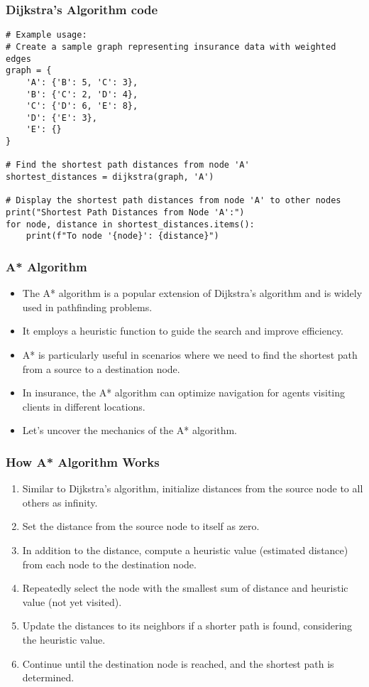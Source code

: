\begin{frame}[fragile]\frametitle{Dijkstra's Algorithm code}
{\tiny
\begin{lstlisting}
# Example usage:
# Create a sample graph representing insurance data with weighted edges
graph = {
    'A': {'B': 5, 'C': 3},
    'B': {'C': 2, 'D': 4},
    'C': {'D': 6, 'E': 8},
    'D': {'E': 3},
    'E': {}
}

# Find the shortest path distances from node 'A'
shortest_distances = dijkstra(graph, 'A')

# Display the shortest path distances from node 'A' to other nodes
print("Shortest Path Distances from Node 'A':")
for node, distance in shortest_distances.items():
    print(f"To node '{node}': {distance}")

\end{lstlisting}
}
\end{frame}


\begin{frame}[fragile]\frametitle{A* Algorithm}
\begin{itemize}
\item The A* algorithm is a popular extension of Dijkstra's algorithm and is widely used in pathfinding problems.
\item It employs a heuristic function to guide the search and improve efficiency.
\item A* is particularly useful in scenarios where we need to find the shortest path from a source to a destination node.
\item In insurance, the A* algorithm can optimize navigation for agents visiting clients in different locations.
\item Let's uncover the mechanics of the A* algorithm.
\end{itemize}
\end{frame}

\begin{frame}[fragile]\frametitle{How A* Algorithm Works}
\begin{enumerate}
\item Similar to Dijkstra's algorithm, initialize distances from the source node to all others as infinity.
\item Set the distance from the source node to itself as zero.
\item In addition to the distance, compute a heuristic value (estimated distance) from each node to the destination node.
\item Repeatedly select the node with the smallest sum of distance and heuristic value (not yet visited).
\item Update the distances to its neighbors if a shorter path is found, considering the heuristic value.
\item Continue until the destination node is reached, and the shortest path is determined.
\end{enumerate}
\end{frame}

